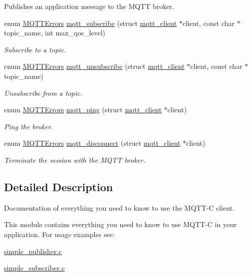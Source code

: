\begin{DoxyCompactItemize}
\begin{DoxyCompactList}
Publishes an application message to the M\+Q\+TT broker. \end{DoxyCompactList}\item 
enum \hyperlink{group__api_gad0c901a8d30691ed0ca17915b691b7e7}{M\+Q\+T\+T\+Errors} \hyperlink{group__api_gaea5da9b546f6e91eb77c9eff9c478de5}{mqtt\+\_\+subscribe} (struct \hyperlink{structmqtt__client}{mqtt\+\_\+client} $\ast$client, const char $\ast$topic\+\_\+name, int max\+\_\+qos\+\_\+level)
\begin{DoxyCompactList}\small\item\em Subscribe to a topic. \end{DoxyCompactList}\item 
enum \hyperlink{group__api_gad0c901a8d30691ed0ca17915b691b7e7}{M\+Q\+T\+T\+Errors} \hyperlink{group__api_ga08d16571dfefa690698c0cca5cca7a1d}{mqtt\+\_\+unsubscribe} (struct \hyperlink{structmqtt__client}{mqtt\+\_\+client} $\ast$client, const char $\ast$topic\+\_\+name)
\begin{DoxyCompactList}\small\item\em Unsubscribe from a topic. \end{DoxyCompactList}\item 
enum \hyperlink{group__api_gad0c901a8d30691ed0ca17915b691b7e7}{M\+Q\+T\+T\+Errors} \hyperlink{group__api_gae472795684a1d973bfb89d075d17a29e}{mqtt\+\_\+ping} (struct \hyperlink{structmqtt__client}{mqtt\+\_\+client} $\ast$client)
\begin{DoxyCompactList}\small\item\em Ping the broker. \end{DoxyCompactList}\item 
enum \hyperlink{group__api_gad0c901a8d30691ed0ca17915b691b7e7}{M\+Q\+T\+T\+Errors} \hyperlink{group__api_ga95d9981735ab4495d3d65e8056611126}{mqtt\+\_\+disconnect} (struct \hyperlink{structmqtt__client}{mqtt\+\_\+client} $\ast$client)
\begin{DoxyCompactList}\small\item\em Terminate the session with the M\+Q\+TT broker. \end{DoxyCompactList}\end{DoxyCompactItemize}


\subsection{Detailed Description}
Documentation of everything you need to know to use the M\+Q\+T\+T-\/C client. 

This module contains everything you need to know to use M\+Q\+T\+T-\/C in your application. For usage examples see\+:
\begin{DoxyItemize}
\item \hyperlink{simple_publisher_8c-example}{simple\+\_\+publisher.\+c}
\item \hyperlink{simple_subscriber_8c-example}{simple\+\_\+subscriber.\+c}
\end{DoxyItemize}

